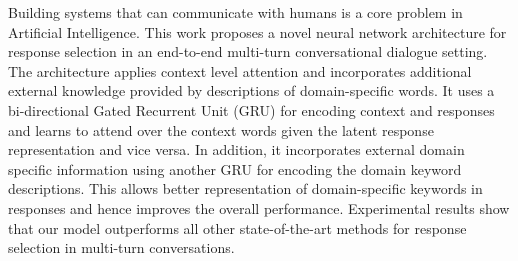 Building systems that can communicate with humans is a core problem in Artificial Intelligence. This work proposes a novel neural network architecture for response selection in an end-to-end multi-turn conversational dialogue setting. The architecture applies context level attention and incorporates additional external knowledge provided by descriptions of domain-specific words. It uses a bi-directional Gated Recurrent Unit (GRU) for encoding context and responses and learns to attend over the context words given the latent response representation and vice versa. In addition, it incorporates external domain specific information using another GRU for encoding the domain keyword descriptions. This allows better representation of domain-specific keywords in responses and hence improves the overall performance. Experimental results show that our model outperforms all other state-of-the-art methods for response selection in multi-turn conversations.
